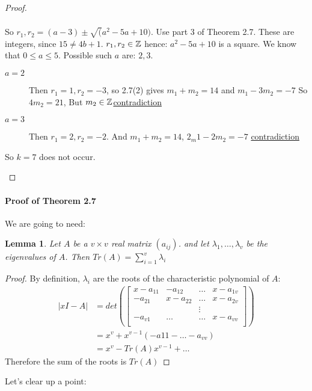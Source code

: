 \documentclass[]{article}
\newtheorem{lem}[thm]{Lemma}
\theoremstyle{definition}
\theoremstyle{remark}
\numberwithin{equation}{section}
\begin{document}
\begin{proof}
\begin{description}
\begin{align*}
							\end{align*}
							So $r_1,r_2 =  (a-3)\pm \sqrt(a^2 - 5a + 10)$. Use part 3 of Theorem 2.7. These are integers, since $15 \neq 4b + 1$.
							$r_1, r_2 \in \mathbb{Z}$ hence: $a^2 -5a + 10$ is a square. We know that $0 \leq a \leq 5$. Possible such $a$ are: $2, 3$.
							\begin{description}
								\item[$a= 2$] Then $r_1 = 1, r_2 = -3$, so 2.7(2) gives $m_1 + m_2 = 14$ and $m_1 - 3m_2 = -7$
								So $4m_2 = 21$, But $m_2 \in \mathbb{Z}$\underline{contradiction}
								\item[$a = 3$] Then $r_1 = 2, r_2 = -2$. And $m_1 + m_2 = 14$, $2_m1 - 2m_2 = -7$ \underline{contradiction}
							\end{description}
							So $k = 7$ does not occur.
					\end{description}
				\end{proof}
				\paragraph{Proof of Theorem 2.7}
				We are going to need:
				\begin{lem} Let $A$ be a $v \times v$ real matrix $(a_{ij})$. and let $\lambda_1, \hdots, \lambda_v$ be the eigenvalues of $A$. Then $Tr(A) = \sum_{i=1}^{v} \lambda_i$
				\end{lem}
				\begin{proof}
					By definition, $\lambda_i$ are the roots of the characteristic polynomial of $A$:
					\begin{align*}
						|xI - A| &= det\left(\begin{bmatrix}
									x - a_{11}& -a_{12} &\hdots& x- a_{1v}\\
									-a_{21}& x-a_{22} &\hdots& x- a_{2v}\\
									& &\vdots &\\
									-a_{v1} & \hdots & \hdots & x-a_{vv}\\
								   \end{bmatrix}\right)\\
								 &= x^v + x^{v-1}(-a{11} - \hdots - a_{vv})\\
								 &= x^v - Tr(A) x^{v-1} + \hdots
					\end{align*}
					Therefore the sum of the roots is $Tr(A)$
				\end{proof}


		Let's clear up a point:
\end{document}
